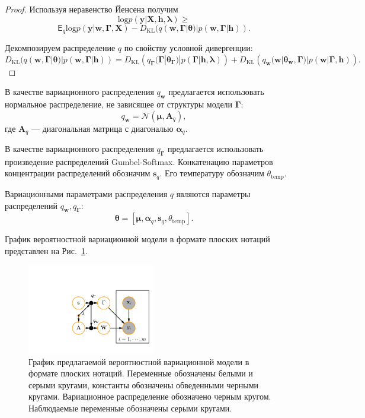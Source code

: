 \begin{proof}
Используя неравенство Йенсена получим 
\[
\text{log} p(\mathbf{y}|\mathbf{X}, \mathbf{h}, \boldsymbol{\lambda}) \geq
\]
\[
   \mathsf{E}_{q} \text{log}p(\mathbf{y}|\mathbf{w}, \boldsymbol{\Gamma}, \mathbf{X}) - D_\text{KL}(q (\mathbf{w},\boldsymbol{\Gamma}|\boldsymbol{\theta})|p(\mathbf{w},\boldsymbol{\Gamma}|\mathbf{h})).
\]

Декомпозируем распределение $q$ по свойству условной дивергенции:
\[
D_\text{KL}(q (\mathbf{w},\boldsymbol{\Gamma}|\boldsymbol{\theta})|p(\mathbf{w},\boldsymbol{\Gamma}|\mathbf{h})) = D_\text{KL}\left(q_{\boldsymbol{\Gamma}}(\boldsymbol{\Gamma}|\boldsymbol{\theta}_{\boldsymbol{\Gamma}})|p(\boldsymbol{\Gamma}|\mathbf{h}, \boldsymbol{\lambda})\right) + D_\text{KL}\left(q_{\mathbf{w}}(\mathbf{w}|\boldsymbol{\theta}_\mathbf{w},\boldsymbol{\Gamma})|p(\mathbf{w}|\boldsymbol{\Gamma}, \mathbf{h})\right).    
\]
\end{proof}

В качестве вариационного распределения $q_{\mathbf{w}}$ предлагается использовать нормальное распределение, не зависящее от структуры модели $\boldsymbol{\Gamma}$:
\[
    q_{\mathbf{w}} = \mathcal{N}(\boldsymbol{\mu}, \mathbf{A}_q), 
\]
где $\mathbf{A}_q$ --- диагональная матрица с диагональю $\boldsymbol{\alpha}_q$.

В качестве вариационного распределения $q_{\boldsymbol{\Gamma}}$ предлагается использовать произведение распределений Gumbel-Softmax. Конкатенацию параметров концентрации распределений обозначим $\mathbf{s}_q$. Его температуру обозначим $\theta_\text{temp}$.

Вариационными параметрами распределения $q$ являются параметры распределений $q_{\mathbf{w}}, q_{\boldsymbol{\Gamma}}$:
\[
    \boldsymbol{\theta} = [\boldsymbol{\mu}, \boldsymbol{\alpha}_q, \mathbf{s}_q, \theta_\text{temp}]. 
\]


График вероятностной вариационной модели в формате плоских нотаций представлен на Рис.~\ref{fig:plate_qprob}.
\begin{figure}
\centering
   \includegraphics[width=0.5\textwidth]{plots/notebooks/plate.pdf}
\caption{График предлагаемой вероятностной вариационной модели в формате плоских нотаций. Переменные обозначены белыми и серыми кругами, константы обозначены обведенными черными кругами. Вариационное распределение обозначено черным кругом. Наблюдаемые переменные обозначены серыми кругами.}
\label{fig:plate_qprob}
\end{figure}

